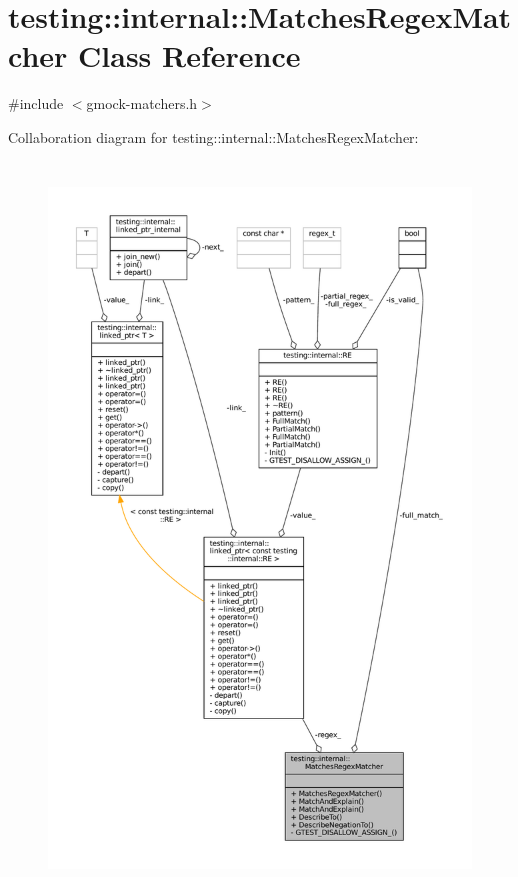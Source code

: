 \hypertarget{classtesting_1_1internal_1_1MatchesRegexMatcher}{}\section{testing\+:\+:internal\+:\+:Matches\+Regex\+Matcher Class Reference}
\label{classtesting_1_1internal_1_1MatchesRegexMatcher}


{\ttfamily \#include $<$gmock-\/matchers.\+h$>$}



Collaboration diagram for testing\+:\+:internal\+:\+:Matches\+Regex\+Matcher\+:
\nopagebreak
\begin{figure}[H]
\begin{center}
\leavevmode
\includegraphics[height=550pt]{classtesting_1_1internal_1_1MatchesRegexMatcher__coll__graph}
\end{center}
\end{figure}
